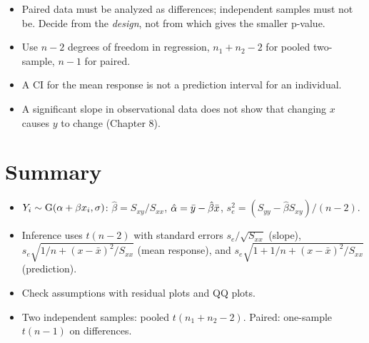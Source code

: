\begin{important}
\begin{itemize}
  \item Paired data must be analyzed as differences; independent samples must not be.
        Decide from the \emph{design}, not from which gives the smaller p-value.
  \item Use $n-2$ degrees of freedom in regression, $n_1+n_2-2$ for pooled two-sample,
        $n-1$ for paired.
  \item A CI for the mean response is not a prediction interval for an individual.
  \item A significant slope in observational data does not show that changing $x$
        causes $y$ to change (Chapter 8).
\end{itemize}
\end{important}

\section*{Summary}
\begin{itemize}
  \item $Y_i\sim\operatorname{G}(\alpha+\beta x_i,\sigma)$: $\hat\beta = S_{xy}/S_{xx}$,
        $\hat\alpha = \bar{y}-\hat\beta\bar x$, $s_e^2 = (S_{yy}-\hat\beta S_{xy})/(n-2)$.
  \item Inference uses $t(n-2)$ with standard errors $s_e/\sqrt{S_{xx}}$ (slope),
        $s_e\sqrt{1/n+(x-\bar x)^2/S_{xx}}$ (mean response), and
        $s_e\sqrt{1+1/n+(x-\bar x)^2/S_{xx}}$ (prediction).
  \item Check assumptions with residual plots and QQ plots.
  \item Two independent samples: pooled $t(n_1+n_2-2)$. Paired: one-sample $t(n-1)$ on
        differences.
\end{itemize}

